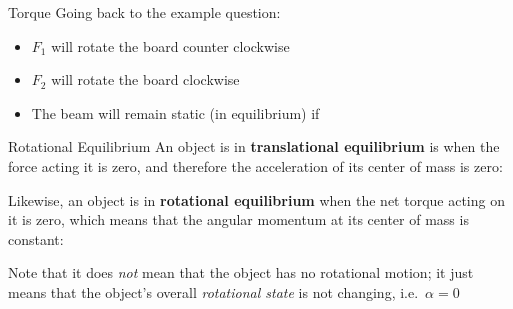 \documentclass[12pt,compress,aspectratio=169]{beamer}
\newcommand{\mb}[1]{\ensuremath\mathbf{#1}}
\newcommand{\eq}[2]{\vspace{#1}{\Large\begin{displaymath}#2\end{displaymath}}}
\begin{document}
\begin{frame}{Torque}
  Going back to the example question:
  \begin{center}
  \end{center}
  \begin{itemize}
  \item<2->$F_1$ will rotate the board counter clockwise
  \item<3->$F_2$ will rotate the board clockwise
  \item<4->The beam will remain static (in equilibrium) if

    \eq{-.2in}{ F_1d_1=F_2d_2 }
  \end{itemize}
\end{frame}



\begin{frame}{Rotational Equilibrium}
  An object is in \textbf{translational equilibrium} is when the force acting
  it is zero, and therefore the acceleration of its center of mass is zero:
  
  \eq{-.2in}{
    \mb{F}=\mb{0}
  }

  \vspace{-.15in}Likewise, an object is in \textbf{rotational equilibrium} when
  the net torque acting on it is zero, which means that the angular momentum at
  its center of mass is constant:

  \eq{-.3in}{
    \bm{\tau}=\mb{0}
  }

  \vspace{-.1in}Note that it does \emph{not} mean that the object has no
  rotational motion; it just means that the object's overall
  \emph{rotational state} is not changing, i.e.\ $\alpha=0$
\end{frame}
\end{document}
